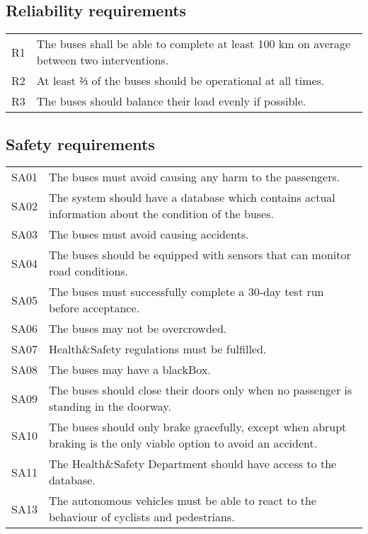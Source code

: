 \documentclass[a4paper]{article}
\begin{document}

\subsection{Reliability requirements}
\begin{tabularx}{\textwidth}{p{.75cm} X}
	R1 & The buses shall be able to complete at least 100 km on average
	     between two interventions. \\

	R2 & At least ⅔ of the buses should be operational at all times. \\

        R3 & The buses should balance their load evenly if possible. \\
\end{tabularx}


\subsection{Safety requirements}
\begin{tabularx}{\textwidth}{p{.75cm} X}
        SA01 & The buses must avoid causing any harm to the passengers. \\

	SA02 & The system should have a database which contains actual
	       information about the condition of the buses. \\

        SA03 & The buses must avoid causing accidents. \\

	SA04 & The buses should be equipped with \gls{sensor}s that can
	       \gls{monitor} road conditions. \\

	SA05 & The buses must successfully complete a 30-day test run before
	       acceptance. \\

        SA06 & The buses may not be overcrowded. \\

        SA07 & Health\&Safety regulations must be fulfilled. \\

        SA08 & The buses may have a \gls{blackBox}. \\

	SA09 & The buses should close their doors only when no passenger is
	       standing in the doorway. \\

	SA10 & The buses should only brake gracefully, except when abrupt
	       braking is the only viable option to avoid an accident. \\

	SA11 & The Health\&Safety Department should have access to the database.
	       \\

	SA13 & The \gls{autonomous} \gls{vehicle}s must be able to react to the
	       behaviour of cyclists and pedestrians. \\
\end{tabularx}
\end{document}
